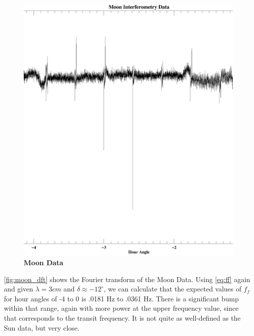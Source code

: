 \documentclass{article}
\begin{document}
\begin{figure}[h!]
 \begin{center}
    \includegraphics[width=5.5in]{moon_data.ps}
    \caption{\bf{Moon Data}}
    \label{fig:moon}
     \end{center}
    \end{figure}

\autoref{fig:moon_dft} shows the Fourier transform of the Moon Data. Using \autoref{eq:ff} again and given $\lambda=3 cm$ and $\delta \approx -12^\circ$, we can calculate that the expected values of $f_f$ for hour angles of -4 to 0 is .0181 Hz to .0361 Hz. There is a significant bump within that range, again with more power at the upper frequency value, since that corresponds to the transit frequency. It is not quite as well-defined as the Sun data, but very close.
\end{document}
